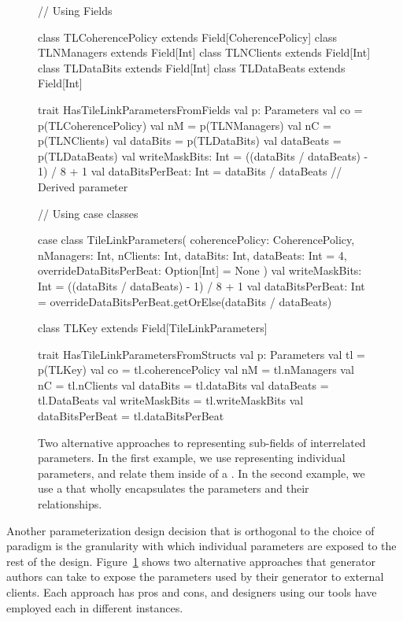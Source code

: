 \begin{figure}
\centering
\begin{scala}
// Using Fields

class TLCoherencePolicy extends Field[CoherencePolicy]
class TLNManagers extends Field[Int]
class TLNClients extends Field[Int]
class TLDataBits extends Field[Int]
class TLDataBeats extends Field[Int]

trait HasTileLinkParametersFromFields {
  val p: Parameters
  val co = p(TLCoherencePolicy)
  val nM = p(TLNManagers)
  val nC = p(TLNClients)
  val dataBits = p(TLDataBits)
  val dataBeats = p(TLDataBeats)
  val writeMaskBits: Int = ((dataBits / dataBeats) - 1) / 8 + 1
  val dataBitsPerBeat: Int = dataBits / dataBeats // Derived parameter
}

// Using case classes

case class TileLinkParameters(
    coherencePolicy: CoherencePolicy,
    nManagers: Int,
    nClients: Int,
    dataBits: Int,
    dataBeats: Int = 4,
    overrideDataBitsPerBeat: Option[Int] = None
    ) {
  val writeMaskBits: Int  = ((dataBits / dataBeats) - 1) / 8 + 1
  val dataBitsPerBeat: Int = overrideDataBitsPerBeat.getOrElse(dataBits / dataBeats)
}

class TLKey extends Field[TileLinkParameters]

trait HasTileLinkParametersFromStructs {
  val p: Parameters
  val tl = p(TLKey)
  val co = tl.coherencePolicy
  val nM = tl.nManagers
  val nC = tl.nClients
  val dataBits = tl.dataBits
  val dataBeats = tl.DataBeats
  val writeMaskBits = tl.writeMaskBits
  val dataBitsPerBeat = tl.dataBitsPerBeat
}
  
\end{scala} 
\caption{
Two alternative approaches to representing sub-fields of interrelated parameters.
In the first example, we use  representing individual parameters, and relate them inside of a .
In the second example, we use a  that wholly encapsulates the parameters and their relationships.
}
\label{fig:fields}
\end{figure}

Another parameterization design decision that is orthogonal to the choice of paradigm is
the granularity with which individual parameters are exposed to the rest of the design.
Figure~\ref{fig:fields} shows two alternative approaches that generator authors can take to expose
the parameters used by their generator to external clients.
Each approach has pros and cons, and designers using our tools have employed each in different instances.

